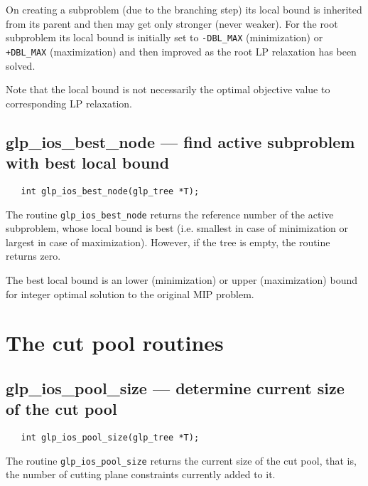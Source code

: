 On creating a subproblem (due to the branching step) its local bound is
inherited from its parent and then may get only stronger (never weaker).
For the root subproblem its local bound is initially set to
\verb|-DBL_MAX| (minimization) or \verb|+DBL_MAX| (maximization) and
then improved as the root LP relaxation has been solved.

Note that the local bound is not necessarily the optimal objective
value to corresponding LP relaxation.

\subsection{glp\_ios\_best\_node --- find active subproblem with best
local bound}

\synopsis

\begin{verbatim}
   int glp_ios_best_node(glp_tree *T);
\end{verbatim}

\returns

The routine \verb|glp_ios_best_node| returns the reference number of
the active subproblem, whose local bound is best (i.e. smallest in case
of minimization or largest in case of maximization). However, if the
tree is empty, the routine returns zero.


The best local bound is an lower (minimization) or upper (maximization)
bound for integer optimal solution to the original MIP problem.


\newpage

\section{The cut pool routines}

\subsection{glp\_ios\_pool\_size --- determine current size of the cut
pool}

\synopsis

\begin{verbatim}
   int glp_ios_pool_size(glp_tree *T);
\end{verbatim}

\returns

The routine \verb|glp_ios_pool_size| returns the current size of the
cut pool, that is, the number of cutting plane constraints currently
added to it.

